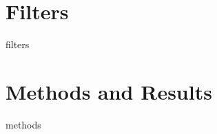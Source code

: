 \documentclass[12pt,a4paper]{article}
\begin{document}
\section{Filters}
	{filters}
\section{Methods and Results}
	{methods}
	
\end{document}
